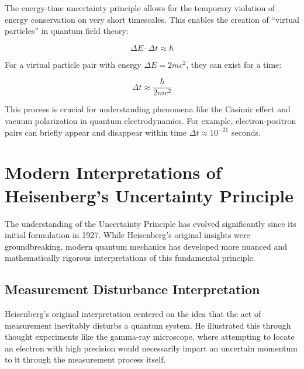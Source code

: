 \documentclass[
  a4paper,
]{book}
\begin{document}
\begin{tcolorbox}[enhanced jigsaw, coltitle=black, title=\textcolor{quarto-callout-note-color}{\faInfo}\hspace{0.5em}{Example: Particle Creation in Quantum Field Theory}, colframe=quarto-callout-note-color-frame, toprule=.15mm, opacitybacktitle=0.6, left=2mm, opacityback=0, breakable, toptitle=1mm, bottomtitle=1mm, leftrule=.75mm, arc=.35mm, titlerule=0mm, colbacktitle=quarto-callout-note-color!10!white, rightrule=.15mm, bottomrule=.15mm, colback=white]

The energy-time uncertainty principle allows for the temporary violation
of energy conservation on very short timescales. This enables the
creation of ``virtual particles'' in quantum field theory:

\[\Delta E \cdot \Delta t \approx \hbar\]

For a virtual particle pair with energy \(\Delta E = 2mc^2\), they can
exist for a time:

\[\Delta t \approx \frac{\hbar}{2mc^2}\]

This process is crucial for understanding phenomena like the Casimir
effect and vacuum polarization in quantum electrodynamics. For example,
electron-positron pairs can briefly appear and disappear within time
\(\Delta t \approx 10^{-21}\) seconds.

\end{tcolorbox}

\section{Modern Interpretations of Heisenberg's Uncertainty
Principle}\label{modern-interpretations-of-heisenbergs-uncertainty-principle}

The understanding of the Uncertainty Principle has evolved significantly
since its initial formulation in 1927. While Heisenberg's original
insights were groundbreaking, modern quantum mechanics has developed
more nuanced and mathematically rigorous interpretations of this
fundamental principle.

\subsection{Measurement Disturbance
Interpretation}\label{measurement-disturbance-interpretation}

Heisenberg's original interpretation centered on the idea that the act
of measurement inevitably disturbs a quantum system. He illustrated this
through thought experiments like the gamma-ray microscope, where
attempting to locate an electron with high precision would necessarily
impart an uncertain momentum to it through the measurement process
itself.
\end{document}
